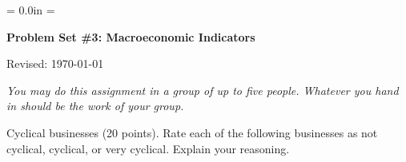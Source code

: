 \documentclass[12pt]{exam}
\def\HeadName{Problem Set \#3}
\begin{document}
\parindent = 0.0in
\parskip = \bigskipamount
\thispagestyle{empty}%
\Head

\centerline{\large \bf \HeadName: Macroeconomic Indicators}
\centerline{Revised:  \today}

\medskip
{\it You may do this assignment in a group of up to five people.
Whatever you hand in should be the work of your group.}

\begin{questions}
\question Cyclical businesses (20 points).
Rate each of the following businesses
as not cyclical, cyclical, or very cyclical.
Explain your reasoning.

\begin{solution}
\end{solution}


\end{questions}
\end{document}
